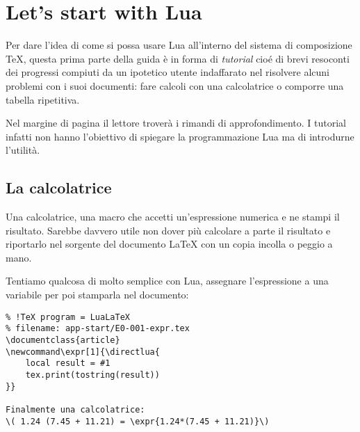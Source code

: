 


\chapter{Let's start with Lua}
\label{chGo}

Per dare l'idea di come si possa usare Lua all'interno del sistema di
composizione \TeX{}, questa prima parte della guida è in forma di
\emph{tutorial} cioé di brevi resoconti dei progressi compiuti da un ipotetico
utente \LuaLaTeX{} indaffarato nel risolvere alcuni problemi con i suoi
documenti: fare calcoli con una calcolatrice o comporre una tabella ripetitiva.

Nel margine di pagina il lettore troverà i rimandi di approfondimento. I
tutorial infatti non hanno l'obiettivo di spiegare la programmazione Lua ma di
introdurne l'utilità.


\section{La calcolatrice}

Una calcolatrice, una macro  che accetti un'espressione numerica e ne
stampi il risultato. Sarebbe davvero utile non dover più calcolare a parte il
risultato e riportarlo nel sorgente del documento \LaTeX{} con un copia incolla
o peggio a mano.

Tentiamo qualcosa di molto semplice con Lua, assegnare l'espressione a una
variabile per poi stamparla nel documento:
%
%
%
%
\begin{Verbatim}
% !TeX program = LuaLaTeX
% filename: app-start/E0-001-expr.tex
\documentclass{article}
\newcommand\expr[1]{\directlua{
    local result = #1
    tex.print(tostring(result))
}}

Finalmente una calcolatrice:
\( 1.24 (7.45 + 11.21) = \expr{1.24*(7.45 + 11.21)}\)

\end{Verbatim}

